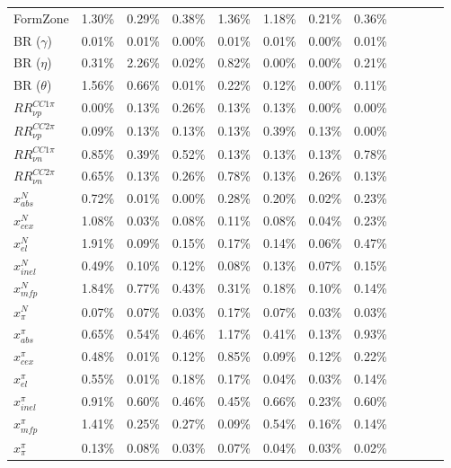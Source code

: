 \documentclass{article}
\begin{document}
\begin{table*}
\begin{tabular}{| l | l | l | l | l | l | l | l | l | l | l | l | }
FormZone  & 1.30\% &  0.29\% &  0.38\% &  1.36\% &  1.18\% &  0.21\% &  0.36\% \\
BR ($\gamma$) &0.01\% &  0.01\% &  0.00\% &  0.01\% &  0.01\% &  0.00\% &  0.01\%\\
BR ($\eta$) &0.31\% &  2.26\% &  0.02\% &  0.82\% &  0.00\% &  0.00\% &  0.21\% \\
BR ($\theta$) & 1.56\% &  0.66\% &  0.01\% &  0.22\% &  0.12\% &  0.00\% &  0.11\% \\ \hline

$RR_{\nu p}^{CC1\pi}$ & 0.00\% &  0.13\% &  0.26\% &  0.13\% &  0.13\% &  0.00\% &  0.00\%\\ 
$RR_{\nu p}^{CC2\pi}$ & 0.09\% &  0.13\% &  0.13\% &  0.13\% &  0.39\% &  0.13\% &  0.00\% \\
$RR_{\nu n}^{CC1\pi}$ & 0.85\% &  0.39\% &  0.52\% &  0.13\% &  0.13\% &  0.13\% &  0.78\%\\ 
$RR_{\nu n}^{CC2\pi}$ & 0.65\% &  0.13\% &  0.26\% &  0.78\% &  0.13\% &  0.26\% &  0.13\%  \\ \hline

$x_{abs}^{N}$ & 0.72\% &  0.01\% &  0.00\% &  0.28\% &  0.20\% &  0.02\% &  0.23\%\\
$x_{cex}^{N}$ &1.08\% &  0.03\% &  0.08\% &  0.11\% &  0.08\% &  0.04\% &  0.23\%\\
$x_{el}^{N}$ & 1.91\% &  0.09\% &  0.15\% &  0.17\% &  0.14\% &  0.06\% &  0.47\% \\
$x_{inel}^{N}$ & 0.49\% &  0.10\% &  0.12\% &  0.08\% &  0.13\% &  0.07\% &  0.15\% \\
$x_{mfp}^{N}$ & 1.84\% &  0.77\% &  0.43\% &  0.31\% &  0.18\% &  0.10\% &  0.14\%  \\
$x_{\pi}^{N}$ &0.07\% &  0.07\% &  0.03\% &  0.17\% &  0.07\% &  0.03\% &  0.03\%  \\
$x_{abs}^{\pi}$ &0.65\% &  0.54\% &  0.46\% &  1.17\% &  0.41\% &  0.13\% &  0.93\% \\
$x_{cex}^{\pi}$ & 0.48\% &  0.01\% &  0.12\% &  0.85\% &  0.09\% &  0.12\% &  0.22\% \\
$x_{el}^{\pi}$ &0.55\% &  0.01\% &  0.18\% &  0.17\% &  0.04\% &  0.03\% &  0.14\%\\
$x_{inel}^{\pi}$ & 0.91\% &  0.60\% &  0.46\% &  0.45\% &  0.66\% &  0.23\% &  0.60\%  \\
$x_{mfp}^{\pi}$ & 1.41\% &  0.25\% &  0.27\% &  0.09\% &  0.54\% &  0.16\% &  0.14\%  \\
$x_{\pi}^{\pi}$ &0.13\% &  0.08\% &  0.03\% &  0.07\% &  0.04\% &  0.03\% &  0.02\%\\
\hline
\end{tabular}
\end{table*}
\end{document}
